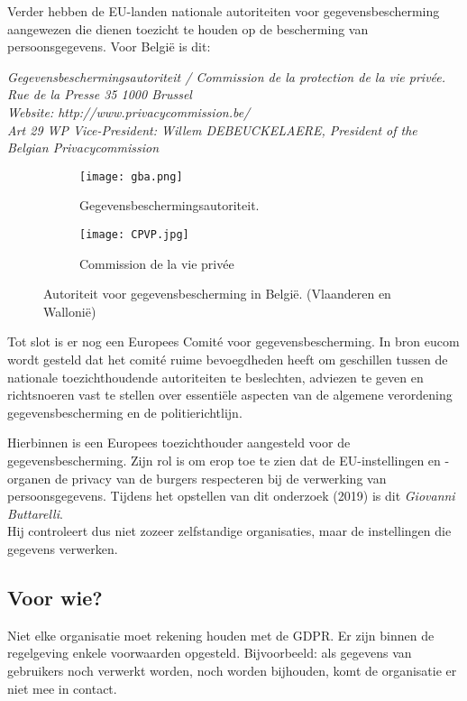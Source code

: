 Verder hebben de EU-landen nationale autoriteiten voor gegevensbescherming aangewezen die dienen toezicht te houden op de bescherming van persoonsgegevens. Voor België is dit: 

\quad \textit{Gegevensbeschermingsautoriteit / Commission de la protection de la vie privée. \\ \quad Rue de la Presse 35 1000 Brussel \\  \quad Website: http://www.privacycommission.be/ \\ 
    \quad Art 29 WP Vice-President: Willem DEBEUCKELAERE, President of the Belgian Privacycommission} 

\begin{figure}[h]
	\centering
	\begin{subfigure}{0.4\textwidth}
		\centering
		\texttt{[image: gba.png]}
		\caption{Gegevensbeschermingsautoriteit.}
	\end{subfigure}
	\begin{subfigure}{0.5\textwidth}
		\centering
		\texttt{[image: CPVP.jpg]}
		\caption{Commission de la vie privée}
	\end{subfigure}%
	\caption{Autoriteit voor gegevensbescherming in België. (Vlaanderen en Wallonië)}
\end{figure}

Tot slot is er nog een Europees Comité voor gegevensbescherming. In bron eucom wordt gesteld dat het comité ruime bevoegdheden heeft om geschillen tussen de nationale toezichthoudende autoriteiten te beslechten, adviezen te geven en richtsnoeren vast te stellen over essentiële aspecten van de algemene verordening gegevensbescherming en de politierichtlijn.



Hierbinnen is een Europees toezichthouder aangesteld voor de gegevensbescherming. Zijn rol is om erop toe te zien dat de EU-instellingen en -organen de privacy van de burgers respecteren bij de verwerking van persoonsgegevens. Tijdens het opstellen van dit onderzoek (2019) is dit \textit{Giovanni Buttarelli}. 
\\ Hij controleert dus niet zozeer zelfstandige organisaties, maar de instellingen die gegevens verwerken. 


\subsection{Voor wie? }
Niet elke organisatie moet rekening houden met de GDPR. Er zijn binnen de regelgeving enkele voorwaarden opgesteld. Bijvoorbeeld: als gegevens van gebruikers noch verwerkt worden, noch worden bijhouden, komt de organisatie er niet mee in contact. 

